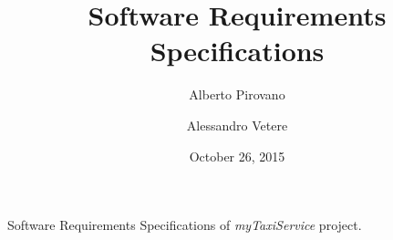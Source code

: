 \documentclass{article}      %
\title{Software Requirements Specifications}    %
\author{Alberto Pirovano \and Alessandro Vetere}      %
\date{October 26, 2015}      %
\newcommand{\myTaxiService}[0]{\emph{myTaxiService}}
\newcommand{\sectionBaseDir}[1]{./section_#1} %
\newcommand{\sectionTexPath}[1]{\sectionBaseDir{#1}/section_#1.tex}
\newcommand{\inputSection}[1]{\newpage}}
\begin{document}
\maketitle                   %
Software Requirements Specifications of \myTaxiService{} project.
\newpage
\tableofcontents             %
\inputSection{1}
\inputSection{2}
\inputSection{3}
\end{document}
